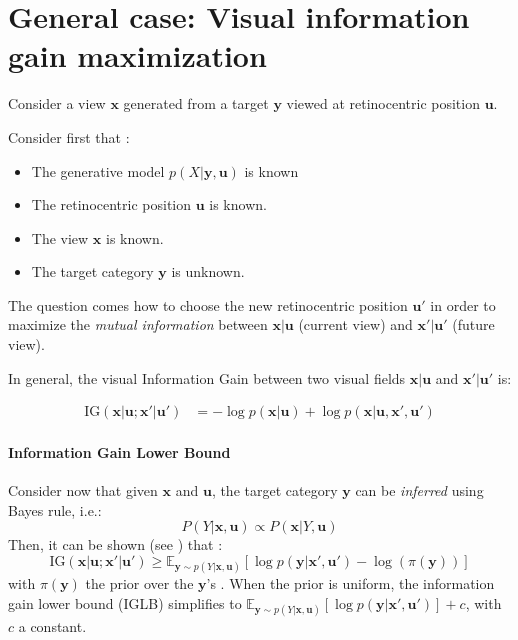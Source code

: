 \section*{General case: Visual information gain maximization}\label{sec:case1}

Consider a view $\boldsymbol{x}$ generated from a target $\boldsymbol{y}$ viewed at retinocentric position $\boldsymbol{u}$.

Consider first that :
\begin{itemize}
	\item The generative model  $p(X|\boldsymbol{y}, \boldsymbol{u})$ is known
	\item The retinocentric position  $\boldsymbol{u}$ is known.
	\item The view $\boldsymbol{x}$ is known.
	\item The target category  $\boldsymbol{y}$ is unknown.
\end{itemize}



The question comes how to choose the new retinocentric position $\boldsymbol{u}'$ in order to maximize the \emph{mutual information} between $\boldsymbol{x}|\boldsymbol{u}$ (current view) and $\boldsymbol{x}'|\boldsymbol{u}'$ (future view).

In general, the visual Information Gain between two visual fields $\boldsymbol{x}|\boldsymbol{u}$  and $\boldsymbol{x}'|\boldsymbol{u}'$ is:

\begin{align*}
\text{IG}(\boldsymbol{x}|\boldsymbol{u}; \boldsymbol{x}'| \boldsymbol{u}')
&= -\log p(\boldsymbol{x}|\boldsymbol{u})
+ \log p(\boldsymbol{x}|\boldsymbol{u}, \boldsymbol{x}', \boldsymbol{u}')
\end{align*}

\paragraph{Information Gain Lower Bound}
Consider now that given  $\boldsymbol{x}$ and $\boldsymbol{u}$, the target category  $\boldsymbol{y}$ can be \emph{inferred} using Bayes rule, i.e.:
$$ P(Y|\boldsymbol{x}, \boldsymbol{u}) \propto  P(\boldsymbol{x}|Y, \boldsymbol{u}) $$
Then, it can be shown (see \cite{Dauce18}) that :
$$\text{IG}(\boldsymbol{x}|\boldsymbol{u}; \boldsymbol{x}'| \boldsymbol{u}') \geq \mathbb{E}_{\boldsymbol{y}\sim p(Y|\boldsymbol{x}, \boldsymbol{u})} \left[\log p(\boldsymbol{y}|\boldsymbol{x}', \boldsymbol{u}') - \log(\pi(\boldsymbol{y})) \right]$$
with  $\pi(\boldsymbol{y})$ the prior over the $\boldsymbol{y}$'s .
When the prior is uniform, the information gain lower bound (IGLB) simplifies to $\mathbb{E}_{\boldsymbol{y}\sim p(Y|\boldsymbol{x}, \boldsymbol{u})} \left[\log p(\boldsymbol{y}|\boldsymbol{x}', \boldsymbol{u}')\right] + c$, with $c$ a constant.

